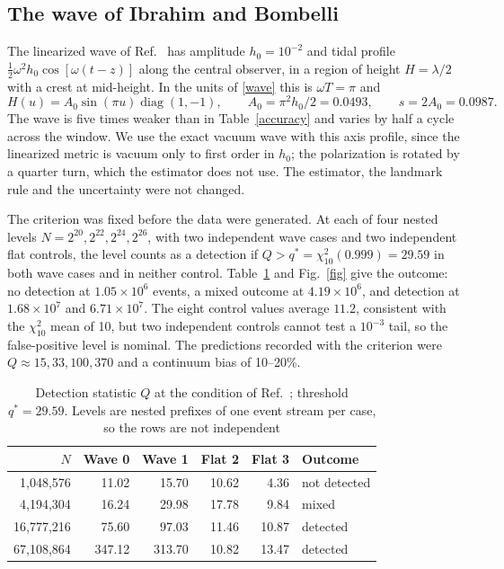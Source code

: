 \documentclass[11pt,a4paper]{article}
\newcommand{\IB}{Ibrahim and Bombelli}
\begin{document}
\subsection{The wave of \IB}\label{ibwave}
The linearized wave of Ref.~\cite{ib} has amplitude $h_0=10^{-2}$ and tidal
profile $\tfrac12\omega^2h_0\cos[\omega(t-z)]$ along the central observer,
in a region of height $H=\lambda/2$ with a crest at mid-height. In the units
of \eqref{wave} this is $\omega T=\pi$ and
\begin{equation}
 H(u)=A_0\sin(\pi u)\operatorname{diag}(1,-1),\qquad
 A_0=\pi^2h_0/2=0.0493,\qquad s=2A_0=0.0987 .
\end{equation}
The wave is five times weaker than in Table~\ref{accuracy} and varies by
half a cycle across the window. We use the exact vacuum wave with this axis
profile, since the linearized metric is vacuum only to first order in $h_0$;
the polarization is rotated by a quarter turn, which the estimator does not
use. The estimator, the landmark rule and the uncertainty were not changed.

The criterion was fixed before the data were generated. At each of four
nested levels $N=2^{20},2^{22},2^{24},2^{26}$, with two independent wave
cases and two independent flat controls, the level counts as a detection if
$Q>q^*=\chi^2_{10}(0.999)=29.59$ in both wave cases and in neither control.
Table~\ref{benchmark} and Fig.~\ref{fig} give the outcome: no detection at
$1.05\times10^6$ events, a mixed outcome at $4.19\times10^6$, and detection
at $1.68\times10^7$ and $6.71\times10^7$. The eight control values average
$11.2$, consistent with the $\chi^2_{10}$ mean of 10, but two independent
controls cannot test a $10^{-3}$ tail, so the false-positive level is
nominal. The predictions recorded with the criterion were
$Q\approx15,33,100,370$ and a continuum bias of 10--20\%.

\begin{table}[t]
\centering\small
\caption{Detection statistic $Q$ at the condition of Ref.~\cite{ib};
threshold $q^*=29.59$. Levels are nested prefixes of one event stream per
case, so the rows are not independent}
\label{benchmark}
\begin{tabular}{rrrrrl}
\toprule
$N$ & Wave 0 & Wave 1 & Flat 2 & Flat 3 & Outcome\\
\midrule
1,048,576 & 11.02 & 15.70 & 10.62 & 4.36 & not detected\\
4,194,304 & 16.24 & 29.98 & 17.78 & 9.84 & mixed\\
16,777,216 & 75.60 & 97.03 & 11.46 & 10.87 & detected\\
67,108,864 & 347.12 & 313.70 & 10.82 & 13.47 & detected\\
\bottomrule
\end{tabular}
\end{table}
\end{document}
